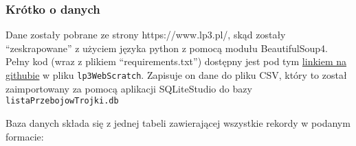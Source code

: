 \documentclass[11pt]{article}
\begin{document}
\hypertarget{kruxf3tko-o-danych}{%
\subsubsection{Krótko o danych}\label{kruxf3tko-o-danych}}

Dane zostały pobrane ze strony https://www.lp3.pl/, skąd zostały
``zeskrapowane'' z użyciem języka python z pomocą modułu BeautifulSoup4.
Pełny kod (wraz z plikiem ``requirements.txt'') dostępny jest pod tym
\href{https://github.com/pkrucz00/trojkaStats}{linkiem na githubie} w
pliku \texttt{lp3WebScratch}. Zapisuje on dane do pliku CSV, który to
został zaimportowany za pomocą aplikacji SQLiteStudio do bazy
\texttt{listaPrzebojowTrojki.db}

Baza danych składa się z jednej tabeli zawierającej wszystkie rekordy w
podanym formacie:
\end{document}
